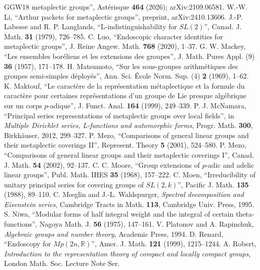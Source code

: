 \documentclass[12pt,letterpaper,openany]{book}
\numberwithin{equation}{chapter}
\theoremstyle{plain}
\theoremstyle{definition}
\theoremstyle{remark}
\theoremstyle{plain}
\begin{document}
\begin{thebibliography}{GGW18}
metaplectic groups'', Ast\'erisque \textbf{464} (2026); arXiv:2109.06581.
 W.-W. Li, ``Arthur packets for metaplectic groups'',
preprint, arXiv:2410.13606.
 J.-P. Labesse and R. P. Langlands, ``L-indistinguishability
for $SL(2)$'', Canad. J. Math. \textbf{31} (1979), 726--785.
 C. Luo, ``Endoscopic character identities for
metaplectic groups'', J. Reine Angew. Math. \textbf{768} (2020), 1--37.
 G. W. Mackey, ``Les ensembles bor\'eliens et les
extensions des groupes'', J. Math. Pures Appl. (9) \textbf{36} (1957),
171--178.
 H. Matsumoto, ``Sur les sous-groupes arithm\'etiques des
groupes semi-simples d\'eploy\'es'', Ann. Sci. \'Ecole Norm. Sup. (4)
\textbf{2} (1969), 1--62.
 K. Maktouf, ``Le caract\`ere de la repr\'esentation
m\'etaplectique et la formule du caract\`ere pour certaines
repr\'esentations d'un groupe de Lie presque alg\'ebrique sur un corps
$p$-adique'', J. Funct. Anal. \textbf{164} (1999), 249--339.
 P. J. McNamara, ``Principal series representations of
metaplectic groups over local fields'', in \emph{Multiple Dirichlet series,
L-functions and automorphic forms}, Progr. Math. \textbf{300},
Birkh\"auser, 2012, 299--327.
 P. Mezo, ``Comparisons of general linear groups and their
metaplectic coverings II'', Represent. Theory \textbf{5} (2001), 524--580.
 P. Mezo, ``Comparisons of general linear groups and their
metaplectic coverings I'', Canad. J. Math. \textbf{54} (2002), 92--137.
 C. C. Moore, ``Group extensions of $p$-adic and adelic linear
groups'', Publ. Math. IHES \textbf{35} (1968), 157--222.
 C. Moen, ``Irreducibility of unitary principal series
for covering groups of $SL(2,k)$'', Pacific J. Math. \textbf{135} (1988),
89--110.
 C. M\oe glin and J.-L. Waldspurger, \emph{Spectral
decomposition and Eisenstein series}, Cambridge Tracts in Math.
\textbf{113}, Cambridge Univ. Press, 1995.
 S. Niwa, ``Modular forms of half integral weight and the
integral of certain theta-functions'', Nagoya Math. J. \textbf{56} (1975),
147--161.
 V. Platonov and A. Rapinchuk, \emph{Algebraic groups and
number theory}, Academic Press, 1994.
 D. Renard, ``Endoscopy for $Mp(2n,\mathbb{R})$'', Amer. J.
Math. \textbf{121} (1999), 1215--1244.
 A. Robert, \emph{Introduction to the representation theory of
compact and locally compact groups}, London Math. Soc. Lecture Note Ser.

\end{thebibliography}
\end{document}
